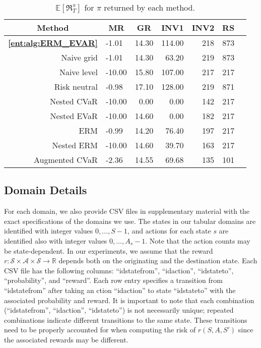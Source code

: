 \documentclass[twoside]{article}
\newcommand{\E}{\mathbb{E}}
\newcommand{\states}{\mathcal{S}}
\newcommand{\actions}{\mathcal{A}}
\newcommand{\Real}{\mathbb{R}}
\theoremstyle{plain}
\theoremstyle{definition}
\theoremstyle{remark}
\begin{document}
\begin{table}
    \caption{$\E\left[\mathfrak{R}^{\pi}_{T}\right]$ for $\pi$ returned by each method.} \label{ent:tab:exp}
    \centering
    \begin{tabular}{rlrrrrr}
      \toprule
    \multicolumn{1}{c|}{Method} & \multicolumn{1}{c}{MR} & \multicolumn{1}{c}{GR} &  \multicolumn{1}{c}{INV1} & \multicolumn{1}{c}{INV2} & \multicolumn{1}{c}{RS}  \\
      \midrule
       \textbf{\cref{ent:alg:ERM_EVAR}} & -1.01 & 14.30 & 114.00 & 218 & 873 \\ 
       Naive grid & -1.01 & 14.30 & 63.20 & 219 & 873 \\ 
       Naive level & -10.00 & 15.80 & 107.00 & 217 & 217 \\ 
      \midrule
       Risk neutral & -0.98 & 17.10 & 128.00 & 219 & 871 \\ 
       Nested CVaR & -10.00 & 0.00 & 0.00 & 142 & 217 \\ 
       Nested EVaR & -10.00 & 14.60 & 0.00 & 182 & 217 \\ 
       ERM & -0.99 & 14.20 & 76.40 & 197 & 217 \\ 
       Nested ERM & -10.00 & 14.60 & 39.70 & 163 & 217 \\ 
      \bottomrule
      Augmented CVaR & -2.36 & 14.55 & 69.68 & 135 & 101 \\
      \bottomrule
    \end{tabular}
\end{table}


\subsection{Domain Details}

For each domain, we also provide CSV files in supplementary material with the exact specifications of the domains we use. The states in our tabular domains are identified with integer values $0, \dots, S-1$, and actions for each state $s$ are identified also with integer values $0, \dots , A_{s}-1$. Note that the action counts may be state-dependent. In our experiments, we assume that the reward $r\colon \states \times \actions \times \states \to \Real$ depends both on the originating and the destination state. Each CSV file has the following columns: ``idstatefrom'', ``idaction'', ``idstateto'', ``probability'', and ``reward''. Each row entry specifies a transition from ``idstatefrom'' after taking an ction ``idaction'' to state ``idstateto'' with the associated probability and reward. It is important to note that each combination (``idstatefrom'', ``idaction'', ``idstateto'') is not necessarily unique; repeated combinations indicate different transitions to the same state. These transitions need to be properly accounted for when computing the risk of $r(S,A,S')$ since the associated rewards may be different. 
\end{document}
